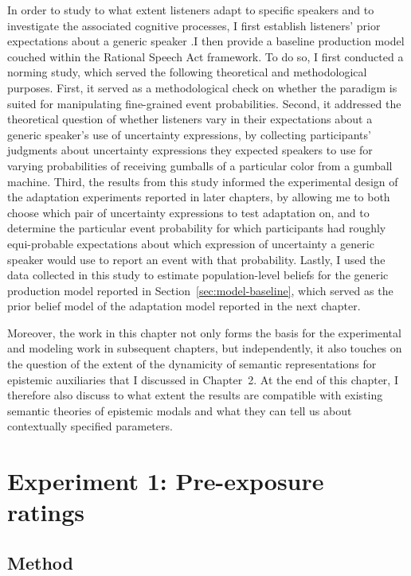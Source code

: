 In order to study to what extent listeners adapt to specific speakers and to investigate the associated cognitive processes, 
I first establish
listeners' prior expectations about a generic speaker .I then provide a baseline production model couched within the Rational Speech Act framework.
To do so, I first conducted a norming study, which served the following theoretical and methodological purposes.
First, it served as a methodological check on whether the paradigm is suited for 
manipulating fine-grained event probabilities. 
Second, it addressed the theoretical question of whether listeners vary in their expectations about
a generic speaker's use of uncertainty expressions, by collecting participants' judgments about 
uncertainty expressions they expected speakers to use for varying probabilities of receiving gumballs of a particular color from a gumball machine. 
Third,  the results from this study informed the experimental design of the adaptation experiments 
reported in later chapters, by allowing me to both choose which pair of uncertainty expressions to test adaptation on, 
and to determine the particular event probability for which participants had roughly equi-probable expectations 
about which expression of uncertainty a generic speaker would use to report an event with that probability. 
Lastly, I used the data collected in this study to 
estimate population-level beliefs for the generic production model reported in 
Section~\ref{sec:model-baseline}, which served as the prior belief model of the
adaptation model reported in the next chapter.

Moreover, the work in this chapter not only forms the basis for the experimental and modeling work in subsequent chapters,
but independently, it also touches on the question of the extent of the dynamicity of semantic representations for epistemic auxiliaries 
 that I discussed in Chapter~2. At the end of this
chapter, I therefore also discuss to what extent the results are compatible with existing semantic theories of epistemic modals
and what they can tell us about contextually specified parameters. 


\section{Experiment 1: Pre-exposure ratings}
\label{sec:exp-norming}

\subsection{Method}

